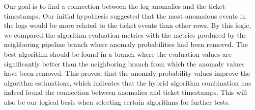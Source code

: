 Our goal is to find a connection
between the log anomalies and the ticket time\-stamps.
Our initial hypothesis suggested
that the most anomalous events in the logs
would be more related to the ticket events than other rows.
By this logic,
we compared the algorithm evaluation metrics
with the metrics produced by the neighboring pipeline branch
where anomaly probabilities had been removed.
The best algorithm should be found in a branch
where the evaluation values are significantly better
than the neighboring branch from which the anomaly values have been removed.
This proves, that the anomaly probability values improve the algorithm estimations,
which indicates that the hybrid algorithm combination has indeed found the connection
between anomalies and ticket timestamps.
This will also be our logical basis when selecting certain algorithms for further tests.



\clearpage